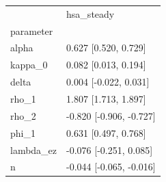 \begin{tabular}{ll}
\toprule
 & hsa\_steady \\
parameter &  \\
\midrule
alpha & 0.627 [0.520, 0.729] \\
kappa\_0 & 0.082 [0.013, 0.194] \\
delta & 0.004 [-0.022, 0.031] \\
rho\_1 & 1.807 [1.713, 1.897] \\
rho\_2 & -0.820 [-0.906, -0.727] \\
phi\_1 & 0.631 [0.497, 0.768] \\
lambda\_ez & -0.076 [-0.251, 0.085] \\
n & -0.044 [-0.065, -0.016] \\
\bottomrule
\end{tabular}
